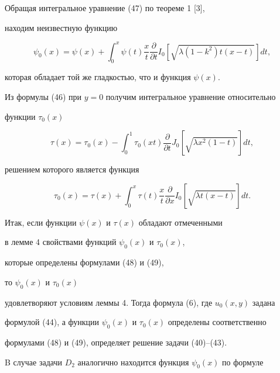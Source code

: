 Обращая интегральное уравнение (47) по теореме 1 [3],


находим неизвестную функцию 


\begin{equation}


\psi_0(x)=\psi(x)+\int_0^x \psi(t)\frac {x}{t}\frac {\partial }


{\partial t}I_0[\sqrt {\lambda (1-k^2)t(x-t)}]dt,


\end{equation}


которая обладает той же гладкостью, что и функция $\psi (x)$.





Из формулы (46) при $y=0$ получим интегральное уравнение относительно


функции $\tau_0(x)$


$$


\tau (x)=\tau_0(x)-\int_0^1 \tau_0(xt)\frac {\partial }


{\partial t}J_0[\sqrt {\lambda x^2(1-t)}]dt,


$$


решением которого является функция


\begin{equation}


\tau_0 (x)=\tau (x)+\int_0^x \tau(t)\frac {x}


{t}\frac {\partial }{\partial x}I_0[\sqrt {\lambda t(x-t)}]dt.


\end{equation}





Итак, если функции $\psi (x)$ и $\tau (x)$ обладают отмеченными


в лемме 4 свойствами функций $\psi_0(x)$ и $\tau_0(x)$,


которые определены формулами (48) и (49),


то $\psi_0(x)$ и $\tau_0(x)$


удовлетворяют условиям леммы 4. Тогда формула (6), где $u_0(x,y)$ задана


формулой (44), а функции $\psi_0(x)$ и $\tau_0(x)$ определены соответственно


формулами (48) и (49), определяет решение задачи (40)--(43).





B случае задачи $D_2$ аналогично находится функция $\psi_0(x)$ по формуле


